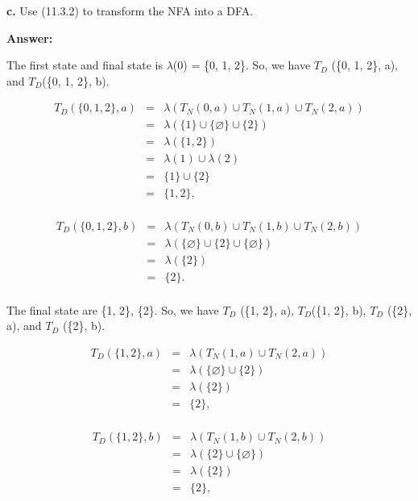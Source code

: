 \documentclass[12pt]{article}
\begin{document}
\textbf{c.}  Use (11.3.2) to transform the NFA into a DFA.

\textbf{Answer:} 

The first state and final state is $\lambda$(0) = \{0, 1, 2\}. So, we have $T_D$ (\{0, 1, 2\}, a),
and $T_D$(\{0, 1, 2\}, b).\\

\begin{center}
\begin{eqnarray*}
T_D(\{0, 1, 2\}, a)
& = & \lambda(T_N(0,a)\cup T_N(1,a) \cup T_N(2,a)) \\
& = & \lambda(\{1\} \cup \{\varnothing\} \cup \{2\}) \\
& = & \lambda(\{1,2\})\\
& = & \lambda(1) \cup \lambda(2) \\
& = & \{1\} \cup \{2\} \\
& = & \{1, 2\}, \\
\end{eqnarray*}
\end{center}

\begin{center}
\begin{eqnarray*}
T_D(\{0, 1, 2\}, b)
& = & \lambda(T_N(0,b)\cup T_N(1,b) \cup T_N(2,b)) \\
& = & \lambda(\{\varnothing\} \cup \{2\} \cup \{\varnothing\}) \\
& = & \lambda(\{2\})\\
& = & \{2\}. \\
\end{eqnarray*}
\end{center}

The final state are \{1, 2\}, \{2\}. So, we have $T_D$ (\{1, 2\}, a), $T_D$(\{1, 2\}, b), 
$T_D$ (\{2\}, a), and $T_D$ (\{2\}, b).\\

\begin{center}
\begin{eqnarray*}
T_D(\{1, 2\}, a)
& = & \lambda(T_N(1,a) \cup T_N(2,a)) \\
& = & \lambda(\{\varnothing\} \cup \{2\}) \\
& = & \lambda(\{2\})\\
& = & \{2\}, \\
\end{eqnarray*}
\end{center}

\begin{center}
\begin{eqnarray*}
T_D(\{1, 2\}, b)
& = & \lambda(T_N(1,b) \cup T_N(2,b)) \\
& = & \lambda(\{2\} \cup \{\varnothing\}) \\
& = & \lambda(\{2\})\\
& = & \{2\}, \\
\end{eqnarray*}
\end{center}
\end{document}
